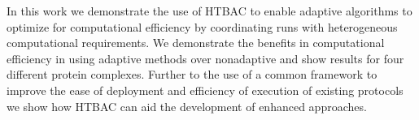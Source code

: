 






In this work we demonstrate the use of HTBAC to enable adaptive  
algorithms to optimize for computational efficiency by coordinating runs with 
heterogeneous computational requirements. We demonstrate the benefits in 
computational efficiency in using adaptive methods over nonadaptive and 
show results for four different protein complexes. 
Further to the use of a common framework to improve the ease of deployment and
efficiency of execution of existing protocols we show how HTBAC can aid the
development of enhanced approaches. 

